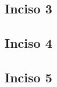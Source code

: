     \subsection{Inciso 3}
        
        \newpage
        
    \subsection{Inciso 4}
        
        \newpage
        
    \subsection{Inciso 5}
        
        \newpage